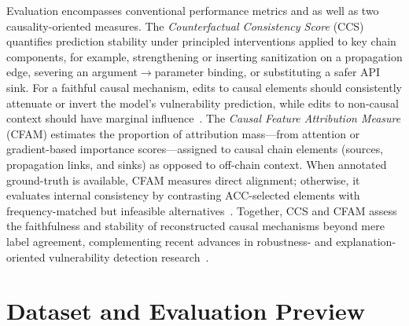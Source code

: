 \documentclass{buthesis}
\begin{document}
Evaluation encompasses conventional performance metrics and as well as two causality-oriented measures. The \emph{Counterfactual Consistency Score} (CCS) quantifies prediction stability under principled interventions applied to key chain components, for example, strengthening or inserting sanitization on a propagation edge, severing an argument$\rightarrow$parameter binding, or substituting a safer API sink. For a faithful causal mechanism, edits to causal elements should consistently attenuate or invert the model’s vulnerability prediction, while edits to non-causal context should have marginal influence~\cite{Cao2024ICSE,Chu2024ISSTA}. The \emph{Causal Feature Attribution Measure} (CFAM) estimates the proportion of attribution mass—from attention or gradient-based importance scores—assigned to causal chain elements (sources, propagation links, and sinks) as opposed to off-chain context. When annotated ground-truth is available, CFAM measures direct alignment; otherwise, it evaluates internal consistency by contrasting ACC-selected elements with frequency-matched but infeasible alternatives~\cite{Kuang2024KSEM,Rahman2024ICSE}. Together, CCS and CFAM assess the faithfulness and stability of reconstructed causal mechanisms beyond mere label agreement, complementing recent advances in robustness- and explanation-oriented vulnerability detection research~\cite{Cao2024ICSE,Cao2024ASE,Chu2024ISSTA,Chakraborty2020,Liu2020}.


\section{Dataset and Evaluation Preview}
\label{sec:intro-dataset}
\end{document}
